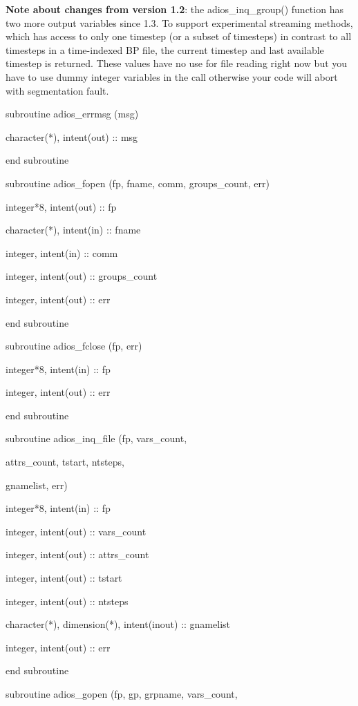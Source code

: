 \textbf{Note about changes from version 1.2}: the adios\_inq\_group() function 
has two more output variables since 1.3. To support experimental streaming methods, 
which has access to only one timestep (or a subset of timesteps) in contrast to 
all timesteps in a time-indexed BP file, the current timestep and last available 
timestep is returned. These values have no use for file reading right now but you 
have to use dummy integer variables in the call otherwise your code will abort 
with segmentation fault. 

subroutine adios\_errmsg (msg)

\parindent=36pt
character(*),   intent(out) :: msg

\parindent=0pt
end subroutine

subroutine adios\_fopen (fp, fname, comm, groups\_count, err)

\parindent=36pt
integer*8,      intent(out) :: fp

character(*),   intent(in)  :: fname

integer,        intent(in)  :: comm

integer,        intent(out) :: groups\_count

integer,        intent(out) :: err

\parindent=0pt
end subroutine

subroutine adios\_fclose (fp, err)

\parindent=36pt
integer*8,      intent(in)  :: fp

integer,        intent(out) :: err

\parindent=0pt
end subroutine

subroutine adios\_inq\_file (fp, vars\_count, 

\parindent=97pt
attrs\_count, tstart, ntsteps, 

gnamelist, err)

\parindent=36pt
integer*8,      intent(in)  :: fp

integer,        intent(out) :: vars\_count

integer,        intent(out) :: attrs\_count

integer,        intent(out) :: tstart

integer,        intent(out) :: ntsteps

character(*), dimension(*), intent(inout) :: gnamelist

integer,        intent(out) :: err

\parindent=0pt
end subroutine

subroutine adios\_gopen (fp, gp, grpname, vars\_count, 


